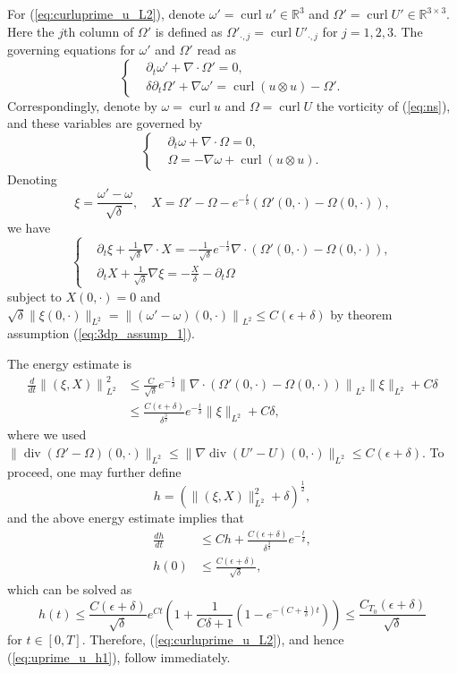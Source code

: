 \documentclass[reqno,10pt]{amsart}
\theoremstyle{definition}
\theoremstyle{remark}
\numberwithin{equation}{section}
\DeclareMathOperator{\dive}{div}
\DeclareMathOperator{\curl}{curl}
\begin{document}
For (\ref{eq:curluprime_u_L2}), denote $\omega' = \curl u' \in\mathbb R^3$ and $\Omega'=\curl U'\in \mathbb R^{3\times 3}$. Here the $j$th column of $\Omega'$ is defined as $\Omega'_{\cdot,j}=\curl U'_{\cdot,j}$ for $j=1,2,3$.
The governing equations for $\omega'$ and $\Omega'$ read as
\[
\left\{ 
\begin{aligned}
    &\partial_t \omega' + \nabla\cdot\Omega'=0, \\
    &\delta \partial_t \Omega' + \nabla \omega' = \curl(u\otimes u)-\Omega'.
\end{aligned}
\right.
\]
Correspondingly, denote by $\omega = \curl u$ and $\Omega=\curl U$ the vorticity of (\ref{eq:ns}), and these variables are governed by
\[
\left\{ 
\begin{aligned}
    &\partial_t \omega + \nabla\cdot\Omega=0, \\
    &\Omega= - \nabla \omega + \curl(u\otimes u).
\end{aligned}
\right.
\]
Denoting
\[
    \xi=\frac{\omega'-\omega}{\sqrt\delta}, \quad
    X = \Omega'-\Omega - e^{-\frac{t}{\delta}}\left( \Omega'(0,\cdot)-\Omega(0,\cdot) \right),
\]
we have
\begin{equation}
\left\{ 
\begin{aligned}
    & \partial_t\xi + \frac{1}{\sqrt\delta} \nabla\cdot X = -\frac{1}{\sqrt\delta} e^{-\frac{t}{\delta}} \nabla\cdot \left( \Omega'(0,\cdot)-\Omega(0,\cdot) \right), \\
    & \partial_t X + \frac{1}{\sqrt\delta}\nabla \xi = -\frac{X}{\delta} - \partial_t\Omega
\end{aligned}
\right.
\end{equation}
subject to $X(0,\cdot)=0$ and $\sqrt\delta\|\xi(0,\cdot)\|_{L^2} = {\| (\omega'-\omega)(0,\cdot)\|}_{L^2} \le C(\epsilon+\delta)$ by theorem assumption (\ref{eq:3dp_assump_1}).

The energy estimate is
\[
\begin{aligned}
    \frac{d}{dt}{\| (\xi,X)\|}_{L^2}^2 &\le \frac{C}{\sqrt\delta} e^{-\frac{t}{\delta}} {\| \nabla\cdot \left( \Omega'(0,\cdot)-\Omega(0,\cdot) \right)\|}_{L^2}\|\xi\|_{L^2} + C\delta \\
    &\le \frac{C(\epsilon+\delta)}{\delta^{\frac{3}{2}}} e^{-\frac{t}{\delta}} \|\xi\|_{L^2} + C\delta,
\end{aligned}
\]
where we used $\| \dive(\Omega'-\Omega)(0,\cdot)\|_{L^2}\le \|\nabla \dive (U'-U)(0,\cdot)\|_{L^2}\le C(\epsilon+\delta)$. To proceed, one may further define
\[
    h=\left( \|(\xi,X)\|_{L^2}^2 + \delta \right)^{\frac{1}{2}},
\]
and the above energy estimate implies that
\[
\begin{aligned}
    \frac{dh}{dt} &\le Ch + \frac{C(\epsilon+\delta)}{\delta^{\frac{3}{2}}}e^{-\frac{t}{\delta}}, \\
    h(0) &\le \frac{C(\epsilon+\delta)}{\sqrt\delta},
\end{aligned}
\]
which can be solved as
\[
    h(t) \le \frac{C(\epsilon+\delta)}{\sqrt\delta}e^{Ct}\left(1+\frac{1}{C\delta+1}\left( 1-e^{-\left(C+\frac{1}{\delta}\right)t} \right)\right) \le \frac{C_{T_0}(\epsilon+\delta)}{\sqrt\delta}
\]
for $t\in[0,T]$. Therefore, (\ref{eq:curluprime_u_L2}), and hence (\ref{eq:uprime_u_h1}), follow immediately.
\end{document}
